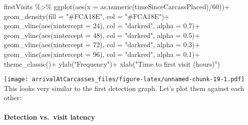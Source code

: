 \documentclass[
]{article}
\newenvironment{Shaded}{\begin{snugshade}}{\end{snugshade}}
\newcommand{\AttributeTok}[1]{\textcolor[rgb]{0.77,0.63,0.00}{#1}}
\newcommand{\DecValTok}[1]{\textcolor[rgb]{0.00,0.00,0.81}{#1}}
\newcommand{\FloatTok}[1]{\textcolor[rgb]{0.00,0.00,0.81}{#1}}
\newcommand{\FunctionTok}[1]{\textcolor[rgb]{0.00,0.00,0.00}{#1}}
\newcommand{\NormalTok}[1]{#1}
\newcommand{\SpecialCharTok}[1]{\textcolor[rgb]{0.00,0.00,0.00}{#1}}
\newcommand{\StringTok}[1]{\textcolor[rgb]{0.31,0.60,0.02}{#1}}
\begin{document}
\begin{Shaded}
\begin{Highlighting}[]
\NormalTok{firstVisits }\SpecialCharTok{\%\textgreater{}\%}
  \FunctionTok{ggplot}\NormalTok{(}\FunctionTok{aes}\NormalTok{(}\AttributeTok{x =} \FunctionTok{as.numeric}\NormalTok{(timeSinceCarcassPlaced)}\SpecialCharTok{/}\DecValTok{60}\NormalTok{))}\SpecialCharTok{+}
  \FunctionTok{geom\_density}\NormalTok{(}\AttributeTok{fill =} \StringTok{"\#FCA18E"}\NormalTok{, }\AttributeTok{col =} \StringTok{"\#FCA18E"}\NormalTok{)}\SpecialCharTok{+}
  \FunctionTok{geom\_vline}\NormalTok{(}\FunctionTok{aes}\NormalTok{(}\AttributeTok{xintercept =} \DecValTok{24}\NormalTok{), }\AttributeTok{col =} \StringTok{"darkred"}\NormalTok{, }\AttributeTok{alpha =} \FloatTok{0.7}\NormalTok{)}\SpecialCharTok{+}
  \FunctionTok{geom\_vline}\NormalTok{(}\FunctionTok{aes}\NormalTok{(}\AttributeTok{xintercept =} \DecValTok{48}\NormalTok{), }\AttributeTok{col =} \StringTok{"darkred"}\NormalTok{, }\AttributeTok{alpha =} \FloatTok{0.5}\NormalTok{)}\SpecialCharTok{+}
  \FunctionTok{geom\_vline}\NormalTok{(}\FunctionTok{aes}\NormalTok{(}\AttributeTok{xintercept =} \DecValTok{72}\NormalTok{), }\AttributeTok{col =} \StringTok{"darkred"}\NormalTok{, }\AttributeTok{alpha =} \FloatTok{0.3}\NormalTok{)}\SpecialCharTok{+}
  \FunctionTok{geom\_vline}\NormalTok{(}\FunctionTok{aes}\NormalTok{(}\AttributeTok{xintercept =} \DecValTok{96}\NormalTok{), }\AttributeTok{col =} \StringTok{"darkred"}\NormalTok{, }\AttributeTok{alpha =} \FloatTok{0.1}\NormalTok{)}\SpecialCharTok{+}
  \FunctionTok{theme\_classic}\NormalTok{()}\SpecialCharTok{+}
  \FunctionTok{ylab}\NormalTok{(}\StringTok{"Frequency"}\NormalTok{)}\SpecialCharTok{+}
  \FunctionTok{xlab}\NormalTok{(}\StringTok{"Time to first visit (hours)"}\NormalTok{)}
\end{Highlighting}
\end{Shaded}

\texttt{[image: arrivalAtCarcasses\_files/figure-latex/unnamed-chunk-19-1.pdf]}
This looks very similar to the first detection graph. Let's plot them
against each other:

\hypertarget{detection-vs.-visit-latency}{%
\paragraph{Detection vs.~visit
latency}\label{detection-vs.-visit-latency}}
\end{document}
